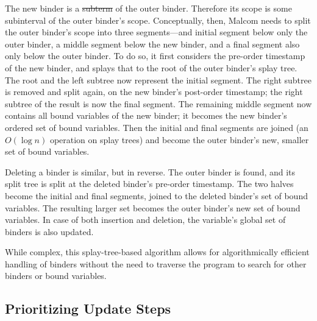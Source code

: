 \documentclass[acmsmall,dvipsnames,10pt,nonacm]{acmart}\settopmatter{printfolios=true} %
\makeatletter
\providecommand{\DIFadd}[1]{{\protect\color{blue}\uwave{#1}}} %
\providecommand{\DIFdel}[1]{{\protect\color{red}\sout{#1}}} %
\providecommand{\DIFaddbegin}{} %
\providecommand{\DIFaddend}{} %
\providecommand{\DIFdelbegin}{} %
\providecommand{\DIFdelend}{} %
\newcommand{\DIFscaledelfig}{0.5}
\newlength{\DIFdelgraphicswidth} %
\newlength{\DIFdelgraphicsheight} %
\newcommand{\DIFaddincludegraphics}[2][]{{\color{blue}\fbox{\DIFOincludegraphics[#1]{#2}}}} %
\newcommand{\DIFdelincludegraphics}[2][]{%
\sbox{\DIFdelgraphicsbox}{\DIFOincludegraphics[#1]{#2}}%
\settoboxwidth{\DIFdelgraphicswidth}{\DIFdelgraphicsbox} %
\settoboxtotalheight{\DIFdelgraphicsheight}{\DIFdelgraphicsbox} %
\scalebox{\DIFscaledelfig}{%
\parbox[b]{\DIFdelgraphicswidth}{\usebox{\DIFdelgraphicsbox}\\[-\baselineskip] \rule{\DIFdelgraphicswidth}{0em}}\llap{\resizebox{\DIFdelgraphicswidth}{\DIFdelgraphicsheight}{%
\setlength{\unitlength}{\DIFdelgraphicswidth}%
\begin{picture}(1,1)%
\thicklines\linethickness{2pt} %
{\color[rgb]{1,0,0}\put(0,0){\framebox(1,1){}}}%
{\color[rgb]{1,0,0}\put(0,0){\line( 1,1){1}}}%
{\color[rgb]{1,0,0}\put(0,1){\line(1,-1){1}}}%
\end{picture}%
}\hspace*{3pt}}} %
} %
\DeclareRobustCommand{\DIFaddbegin}{\DIFOaddbegin \let\includegraphics\DIFaddincludegraphics} %
\DeclareRobustCommand{\DIFaddend}{\DIFOaddend \let\includegraphics\DIFOincludegraphics} %
\DeclareRobustCommand{\DIFdelbegin}{\DIFOdelbegin \let\includegraphics\DIFdelincludegraphics} %
\DeclareRobustCommand{\DIFdelend}{\DIFOaddend \let\includegraphics\DIFOincludegraphics} %
\let\sout@orig\sout %
\renewcommand{\sout}[1]{\ifmmode\text{\sout@orig{\ensuremath{#1}}}\else\sout@orig{#1}\fi} %
\makeatother
\begin{document}
The new binder is a \DIFdelbegin \DIFdel{subterm }\DIFdelend \DIFaddbegin \DIFadd{descendant }\DIFaddend of the outer binder. Therefore its scope is some subinterval of the outer binder's scope. Conceptually, then, Malcom needs to split the outer binder's scope into three segments---and initial segment below only the outer binder, a middle segment below the new binder, and a final segment also only below the outer binder. To do so, it first considers the pre-order timestamp of the new binder, and splays that to the root of the outer binder's splay tree. The root and the left subtree now represent the initial segment. The right subtree is removed and split again, on the new binder's post-order timestamp; the right subtree of the result is now the final segment. The remaining middle segment now contains all bound variables of the new binder; it becomes the new binder's ordered set of bound variables. Then the initial and final segments are joined (an $O(\log n)$ operation on splay trees) and become the outer binder's new, smaller set of bound variables. %

Deleting a binder is similar, but in reverse. The outer binder is found, and its split tree is split at the deleted binder's pre-order timestamp. The two halves become the initial and final segments, joined to the deleted binder's set of bound variables. The resulting larger set becomes the outer binder's new set of bound variables. In case of both insertion and deletion, the variable's global set of binders is also updated.

While complex, this splay-tree-based algorithm allows for algorithmically efficient handling of binders without the need to traverse the program to search for other binders or bound variables.

\subsection{Prioritizing Update Steps}
\label{subsec:Update Priority Queue}
\end{document}
